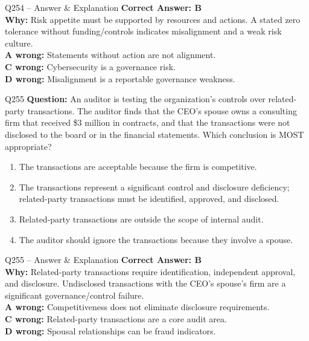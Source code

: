 \documentclass[aspectratio=169,10pt]{beamer}
\begin{document}
	\begin{frame}[t]{Q254 -- Answer \& Explanation}
		\small
		\textbf{Correct Answer: B} \\[4pt]
		\textbf{Why:} Risk appetite must be supported by resources and actions. A stated zero tolerance without funding/controls indicates misalignment and a weak risk culture. \\[4pt]
		\textbf{A wrong:} Statements without action are not alignment. \\[2pt]
		\textbf{C wrong:} Cybersecurity is a governance risk. \\[2pt]
		\textbf{D wrong:} Misalignment is a reportable governance weakness.
	\end{frame}
	
	\begin{frame}[t]{Q255}
		\small
		\textbf{Question:} An auditor is testing the organization's controls over related-party transactions. The auditor finds that the CEO's spouse owns a consulting firm that received \$3 million in contracts, and that the transactions were not disclosed to the board or in the financial statements. Which conclusion is MOST appropriate?
		\begin{enumerate}[label=\Alph*.,itemsep=1pt,topsep=2pt]
			\item The transactions are acceptable because the firm is competitive.
			\item The transactions represent a significant control and disclosure deficiency; related-party transactions must be identified, approved, and disclosed.
			\item Related-party transactions are outside the scope of internal audit.
			\item The auditor should ignore the transactions because they involve a spouse.
		\end{enumerate}
	\end{frame}
	
	\begin{frame}[t]{Q255 -- Answer \& Explanation}
		\small
		\textbf{Correct Answer: B} \\[4pt]
		\textbf{Why:} Related-party transactions require identification, independent approval, and disclosure. Undisclosed transactions with the CEO's spouse's firm are a significant governance/control failure. \\[4pt]
		\textbf{A wrong:} Competitiveness does not eliminate disclosure requirements. \\[2pt]
		\textbf{C wrong:} Related-party transactions are a core audit area. \\[2pt]
		\textbf{D wrong:} Spousal relationships can be fraud indicators.
	\end{frame}
	
\end{document}
